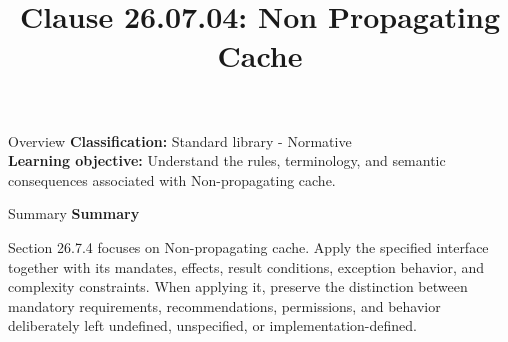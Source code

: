 \documentclass[10pt,letterpaper]{article}
\title{Clause 26.07.04: Non Propagating Cache}
\author{}
\date{}
\begin{document}
\maketitle
\begin{CornellOverviewBox}{Overview}
\textbf{Classification:} Standard library - Normative\\[2pt]
\textbf{Learning objective:} Understand the rules, terminology, and semantic consequences associated with Non-propagating cache.
\end{CornellOverviewBox}\begin{CornellSummaryBox}{Summary}
{\sffamily\bfseries\color{Accent} Summary}\par\vspace{3pt}Section 26.7.4 focuses on Non-propagating cache. Apply the specified interface together with its mandates, effects, result conditions, exception behavior, and complexity constraints. When applying it, preserve the distinction between mandatory requirements, recommendations, permissions, and behavior deliberately left undefined, unspecified, or implementation-defined.
\end{CornellSummaryBox}
\end{document}
